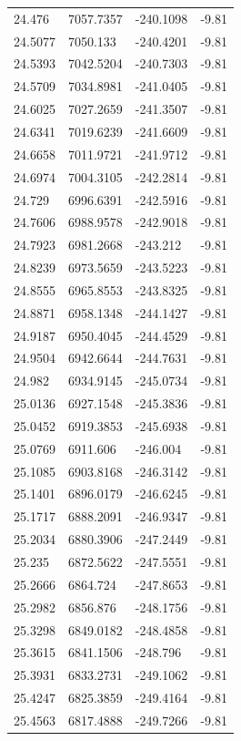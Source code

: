 \begin{table}[H]
\begin{tabular}{llll}
24.476 & 7057.7357 & -240.1098 & -9.81 \\
24.5077 & 7050.133 & -240.4201 & -9.81 \\
24.5393 & 7042.5204 & -240.7303 & -9.81 \\
24.5709 & 7034.8981 & -241.0405 & -9.81 \\
24.6025 & 7027.2659 & -241.3507 & -9.81 \\
24.6341 & 7019.6239 & -241.6609 & -9.81 \\
24.6658 & 7011.9721 & -241.9712 & -9.81 \\
24.6974 & 7004.3105 & -242.2814 & -9.81 \\
24.729 & 6996.6391 & -242.5916 & -9.81 \\
24.7606 & 6988.9578 & -242.9018 & -9.81 \\
24.7923 & 6981.2668 & -243.212 & -9.81 \\
24.8239 & 6973.5659 & -243.5223 & -9.81 \\
24.8555 & 6965.8553 & -243.8325 & -9.81 \\
24.8871 & 6958.1348 & -244.1427 & -9.81 \\
24.9187 & 6950.4045 & -244.4529 & -9.81 \\
24.9504 & 6942.6644 & -244.7631 & -9.81 \\
24.982 & 6934.9145 & -245.0734 & -9.81 \\
25.0136 & 6927.1548 & -245.3836 & -9.81 \\
25.0452 & 6919.3853 & -245.6938 & -9.81 \\
25.0769 & 6911.606 & -246.004 & -9.81 \\
25.1085 & 6903.8168 & -246.3142 & -9.81 \\
25.1401 & 6896.0179 & -246.6245 & -9.81 \\
25.1717 & 6888.2091 & -246.9347 & -9.81 \\
25.2034 & 6880.3906 & -247.2449 & -9.81 \\
25.235 & 6872.5622 & -247.5551 & -9.81 \\
25.2666 & 6864.724 & -247.8653 & -9.81 \\
25.2982 & 6856.876 & -248.1756 & -9.81 \\
25.3298 & 6849.0182 & -248.4858 & -9.81 \\
25.3615 & 6841.1506 & -248.796 & -9.81 \\
25.3931 & 6833.2731 & -249.1062 & -9.81 \\
25.4247 & 6825.3859 & -249.4164 & -9.81 \\
25.4563 & 6817.4888 & -249.7266 & -9.81 \\

\end{tabular}
\end{table}
